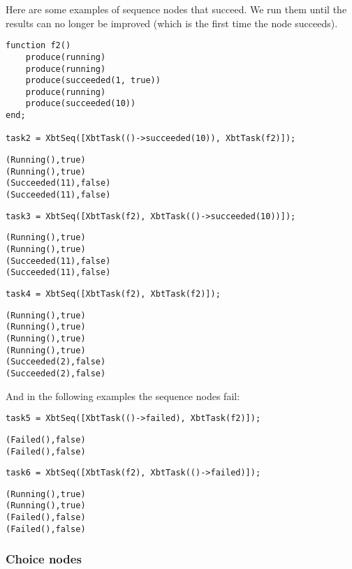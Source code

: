 \documentclass[a4wide]{article}
\begin{document}
Here are some examples of sequence nodes that succeed. We run them
until the results can no longer be improved (which is the first
time the node succeeds).

\begin{verbatim}
function f2()
    produce(running)
    produce(running)
    produce(succeeded(1, true))
    produce(running)
    produce(succeeded(10))
end;

task2 = XbtSeq([XbtTask(()->succeeded(10)), XbtTask(f2)]);
\end{verbatim}

\begin{verbatim}
(Running(),true)
(Running(),true)
(Succeeded(11),false)
(Succeeded(11),false)
\end{verbatim}

\begin{verbatim}
task3 = XbtSeq([XbtTask(f2), XbtTask(()->succeeded(10))]);
\end{verbatim}

\begin{verbatim}
(Running(),true)
(Running(),true)
(Succeeded(11),false)
(Succeeded(11),false)
\end{verbatim}

\begin{verbatim}
task4 = XbtSeq([XbtTask(f2), XbtTask(f2)]);
\end{verbatim}

\begin{verbatim}
(Running(),true)
(Running(),true)
(Running(),true)
(Running(),true)
(Succeeded(2),false)
(Succeeded(2),false)
\end{verbatim}

And in the following examples the sequence nodes fail:

\begin{verbatim}
task5 = XbtSeq([XbtTask(()->failed), XbtTask(f2)]);
\end{verbatim}

\begin{verbatim}
(Failed(),false)
(Failed(),false)
\end{verbatim}

\begin{verbatim}
task6 = XbtSeq([XbtTask(f2), XbtTask(()->failed)]);
\end{verbatim}
\begin{verbatim}
(Running(),true)
(Running(),true)
(Failed(),false)
(Failed(),false)
\end{verbatim}

\subsubsection{Choice nodes}
\label{sec-3-5-2}
\end{document}
